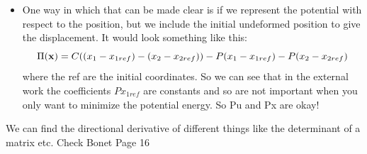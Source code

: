 	\begin{frame}
		\begin{itemize}
			\item One way in which that can be made clear is if we represent the potential with respect to the position, but we include the initial undeformed position to give the displacement. It would look something like this:
			\begin{equation}
				\Pi(\mathbf{x}) = C((x_1  - x_{1ref})- (x_2- x_{2ref}) ) - P(x_1  - x_{1ref}) - P(x_2- x_{2ref})
			\end{equation}
			where the ref are the initial coordinates. So we can see that in the external work the coefficients $Px_{1ref}$ are constants and so are not important when you only want to minimize the potential energy. So Pu and Px are okay!
	 	\end{itemize}
	\end{frame}


	\begin{frame}
		 We can find the directional derivative of different things like the determinant of a matrix etc. Check Bonet Page 16
	\end{frame}

